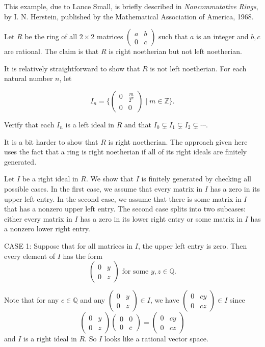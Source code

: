 \documentclass[12pt]{article}
\begin{document}

This example, due to Lance Small, is briefly described in \emph{Noncommutative Rings}, by I. N. Herstein, published by the Mathematical Association of America, 1968.

Let $R$ be the ring of all $2\times2$ matrices
\(
\begin{pmatrix}
a & b\\
0 & c
\end{pmatrix}
\)
such that $a$ is an integer and $b,c$ are rational. The claim is that $R$ is right noetherian but not left noetherian.


It is relatively straightforward to show that $R$ is not left noetherian. For each natural number $n$, let

\[
I_n = \{
\begin{pmatrix}
0 & \frac{m}{2^n}\\
0  & 0
\end{pmatrix} 
\mid m\in \mathbb{Z}\}.
\]


Verify that each $I_n$ is a left ideal in $R$ and that $I_0\subsetneq I_1\subsetneq I_2\subsetneq \cdots$.

It is a bit harder to show that $R$ is right noetherian. The approach given here uses 
the fact that a ring is right noetherian if all of its right ideals are finitely generated.

Let $I$ be a right ideal in $R$. We show that $I$ is finitely generated by 
checking all possible cases. In the first case, we assume that every matrix in $I$ has 
a zero in its upper left entry. In the second case, we assume that 
there is some matrix in $I$ that has a nonzero upper left entry. The second case splits
into two subcases: either every matrix in $I$ has a zero in its lower right entry or some matrix in $I$ has a nonzero lower right entry.

CASE 1: Suppose that for all matrices in $I$, the upper left entry is zero. Then every element of $I$ has the form
\[
\begin{pmatrix}
0 & y\\
0 & z
\end{pmatrix}
\text{ for some }y, z\in \mathbb{Q}.
\]

Note that for any $c\in\mathbb{Q}$ and any
\(
\begin{pmatrix}
0 & y\\
0 & z
\end{pmatrix}
\in I
\), we have
\(
\begin{pmatrix}
0 & cy\\
0 & cz
\end{pmatrix}
\in I
\) since
\[
\begin{pmatrix}
0 & y\\
0 & z
\end{pmatrix}
\begin{pmatrix}
0 & 0\\
0 & c
\end{pmatrix}
=
\begin{pmatrix}
0 & cy\\
0 & cz
\end{pmatrix}
\]
and $I$ is a right ideal in $R$. So $I$ looks like a rational vector space.
\end{document}
